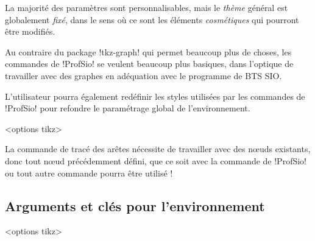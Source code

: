 \documentclass[french,a4paper,11pt]{article}
\begin{document}
\begin{warningblock}
La majorité des paramètres sont personnalisables, mais le \textit{thème} général est globalement \textit{fixé}, dans le sens où ce sont les éléments \textit{cosmétiques} qui pourront être modifiés.

\smallskip

Au contraire du package \packagetex!tkz-graph! qui permet beaucoup plus de choses, les commandes de \packagetex!ProfSio! se veulent beaucoup plus basiques, dans l'optique de travailler avec des graphes en adéquation avec le programme de BTS SIO.
\end{warningblock}

\begin{noteblock}
L'utilisateur pourra également redéfinir les styles utilisées par les commandes de \packagetex!ProfSio! pour refondre le paramétrage global de l'environnement.
\end{noteblock}

\begin{DemoCode}
\begin{GrapheTikz}[clés]<options tikz>
\end{GrapheTikz}
\end{DemoCode}

\begin{tipblock}
La commande de tracé des arêtes nécessite de travailler avec des nœuds existants, donc tout nœud précédemment défini, que ce soit avec la commande de \packagetex!ProfSio! ou tout autre commande pourra être utilisé !
\end{tipblock}

\subsection{Arguments et clés pour l'environnement}

\begin{DemoCode}
\begin{GrapheTikz}[clés]<options tikz>
\end{GrapheTikz}
\end{DemoCode}
\end{document}
